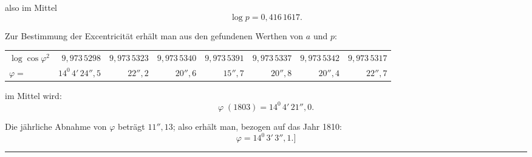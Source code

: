 \begin{landscape}
\[\]
\par\noindent also im Mittel
\[
\log p=0{,}416\,1617.
\]
\par\noindent Zur Bestimmung der Excentricität erhält man aus den gefundenen Werthen von \(a\) und \(p\):
\begingroup
\small\setlength{\tabcolsep}{5pt}\renewcommand{\arraystretch}{1.18}
\begin{center}
\begin{tabular}{@{}lrrrrrrr@{}}
\(\log\cos\varphi^2\)&\(9{,}973\,5298\)&\(9{,}973\,5323\)&\(9{,}973\,5340\)&\(9{,}973\,5391\)&\(9{,}973\,5337\)&\(9{,}973\,5342\)&\(9{,}973\,5317\)\\
\(\varphi=\)&\(14^0\,4'\,24''{,}5\)&\(22''{,}2\)&\(20''{,}6\)&\(15''{,}7\)&\(20''{,}8\)&\(20''{,}4\)&\(22''{,}7\)
\end{tabular}
\end{center}
\endgroup
\par\noindent im Mittel wird:
\[
\varphi\;(1803)=14^0\,4'\,21''{,}0.
\]
\par\noindent Die jährliche Abnahme von \(\varphi\) beträgt \(11''{,}13\); also erhält man, bezogen auf das Jahr 1810:
\[
\varphi=14^0\,3'\,3''{,}1.]
\]
\begin{center}\rule{.24\linewidth}{.4pt}\end{center}
\clearpage
\endgroup
\end{landscape}
